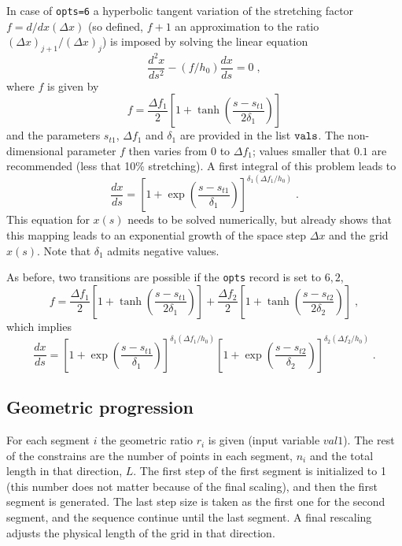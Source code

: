 In case of {\tt opts=6} a hyperbolic tangent variation of the stretching factor
$f=d/dx (\Delta x)$ (so defined, $f+1$ an approximation to the ratio $(\Delta x)
_{j+1}/(\Delta x) _{j} $) is imposed by solving the linear equation
\begin{equation}
\frac{d^2x}{ds^2} - (f/h_0)\frac{dx}{ds} = 0 \;,
\end{equation}
where $f$ is given by
\begin{equation}
f = \frac{\Delta f_1}{2}\left[ 1 + \tanh\left(\frac{s-s_{t1}}{2\delta_1}\right)\right]
\end{equation}
and the parameters $s_{t1}$, $\Delta f_1$ and $\delta_1$ are provided in the list
${\tt vals}$. The non-dimensional parameter $f$ then varies from $0$ to $\Delta
f_1$; values smaller that $0.1$ are recommended (less that 10\% stretching). A
first integral of this problem leads to
\begin{equation}
\frac{dx}{ds} =
\left[1+\exp\left(\frac{s-s_{t1}}{\delta_1}\right)\right]^{\delta_1(\Delta f_1/h_0)} \;.
\end{equation}
This equation for $x(s)$ needs to be solved numerically, but already shows that
this mapping leads to an exponential growth of the space step $\Delta x$ and the
grid $x(s)$. Note that $\delta_1$ admits negative values.

As before, two transitions are possible if the {\tt opts} record is set to $6,2$,
\begin{equation}
  f = \frac{\Delta f_1}{2}\left[ 1 + \tanh\left(\frac{s-s_{t1}}{2\delta_1}\right)\right]
  + \frac{\Delta f_2}{2}\left[ 1 + \tanh\left(\frac{s-s_{t2}}{2\delta_2}\right)\right] \;,
\end{equation}
which implies
\begin{equation}
  \frac{dx}{ds} =
  \left[1+\exp\left(\frac{s-s_{t1}}{\delta_1}\right)\right]^{\delta_1(\Delta f_1/h_0)}
  \left[1+\exp\left(\frac{s-s_{t2}}{\delta_2}\right)\right]^{\delta_2(\Delta f_2/h_0)}\;.
\end{equation}

\subsection{Geometric progression}
For each segment $i$ the geometric ratio $r_i$ is given (input variable
$val1$). The rest of the constrains are the number of points in each segment,
$n_i$ and the total length in that direction, $L$.  The first step of the first
segment is initialized to 1 (this number does not matter because of the final
scaling), and then the first segment is generated. The last step size is taken
as the first one for the second segment, and the sequence continue until the
last segment. A final rescaling adjusts the physical length of the grid in that
direction.

